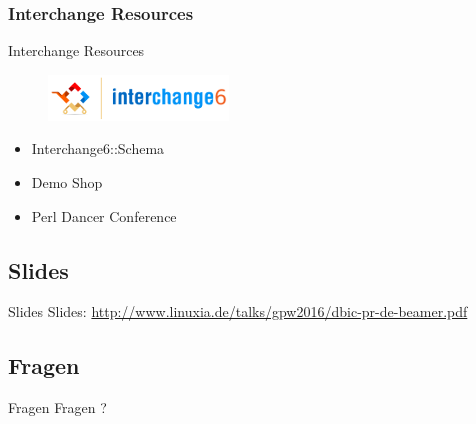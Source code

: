 \subsubsection{Interchange Resources}

\begin{frame}{Interchange Resources}
\begin{figure}[!ht]
\centering
\includegraphics[width=0.4\linewidth]{img/interchange6-logo-v2.png}
\end{figure}
\begin{itemize}
\item Interchange6::Schema
\item Demo Shop
\item Perl Dancer Conference
\end{itemize}
\end{frame}

\subsection{Slides}

\begin{frame}{Slides}
Slides:
\url{http://www.linuxia.de/talks/gpw2016/dbic-pr-de-beamer.pdf}
\end{frame}

\subsection{Fragen}

\begin{frame}{Fragen}
\centering
Fragen ?
\end{frame}



